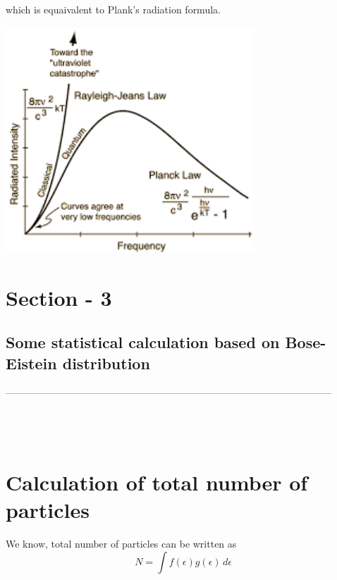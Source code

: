 \documentclass[12pt, letterpaper]{article}
\begin{document}
    which is equaivalent to Plank's radiation formula.
    \begin{adjustbox}{center,caption={},label={somelabel},nofloat=figure,vspace=\bigskipamount}
        \includegraphics[width=0.7\textwidth]{fig4}
    \end{adjustbox}

    \newpage
    \section*{Section - 3}
    \subsection*{Some statistical calculation based on Bose-Eistein distribution}
    \noindent
    --------------------------------------------------------------------------------------------------- \\ 
    \\
    \\
    \\

    \section*{ Calculation of total number of particles}
    We know, total number of particles can be written as 
    \begin{equation}
        N = \int f(\epsilon) g(\epsilon) \,d\epsilon 
    \end{equation}
\end{document}
